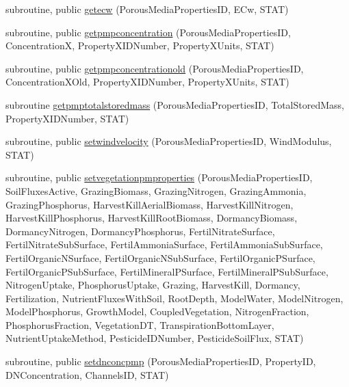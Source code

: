 \begin{DoxyCompactItemize}
subroutine, public \mbox{\hyperlink{namespacemoduleporousmediaproperties_a24f7231dc218de6931238c8726e07bf9}{getecw}} (Porous\+Media\+Properties\+ID, E\+Cw, S\+T\+AT)
\item 
subroutine, public \mbox{\hyperlink{namespacemoduleporousmediaproperties_a7f77a3cf092866b51da8931bff80a9e3}{getpmpconcentration}} (Porous\+Media\+Properties\+ID, ConcentrationX, Property\+X\+I\+D\+Number, Property\+X\+Units, S\+T\+AT)
\item 
subroutine, public \mbox{\hyperlink{namespacemoduleporousmediaproperties_aad77475234f116fbce60ab8837dfd9e9}{getpmpconcentrationold}} (Porous\+Media\+Properties\+ID, Concentration\+X\+Old, Property\+X\+I\+D\+Number, Property\+X\+Units, S\+T\+AT)
\item 
subroutine \mbox{\hyperlink{namespacemoduleporousmediaproperties_a2c248d4114a4213bca448f9d77478f28}{getpmptotalstoredmass}} (Porous\+Media\+Properties\+ID, Total\+Stored\+Mass, Property\+X\+I\+D\+Number, S\+T\+AT)
\item 
subroutine, public \mbox{\hyperlink{namespacemoduleporousmediaproperties_a3c0d671b8b697248b218443e59bb2cb8}{setwindvelocity}} (Porous\+Media\+Properties\+ID, Wind\+Modulus, S\+T\+AT)
\item 
subroutine, public \mbox{\hyperlink{namespacemoduleporousmediaproperties_aa2e7bcc28c7132e8ea2228f7f1e227d2}{setvegetationpmproperties}} (Porous\+Media\+Properties\+ID, Soil\+Fluxes\+Active, Grazing\+Biomass, Grazing\+Nitrogen, Grazing\+Ammonia, Grazing\+Phosphorus, Harvest\+Kill\+Aerial\+Biomass, Harvest\+Kill\+Nitrogen, Harvest\+Kill\+Phosphorus, Harvest\+Kill\+Root\+Biomass, Dormancy\+Biomass, Dormancy\+Nitrogen, Dormancy\+Phosphorus, Fertil\+Nitrate\+Surface, Fertil\+Nitrate\+Sub\+Surface, Fertil\+Ammonia\+Surface, Fertil\+Ammonia\+Sub\+Surface, Fertil\+Organic\+N\+Surface, Fertil\+Organic\+N\+Sub\+Surface, Fertil\+Organic\+P\+Surface, Fertil\+Organic\+P\+Sub\+Surface, Fertil\+Mineral\+P\+Surface, Fertil\+Mineral\+P\+Sub\+Surface, Nitrogen\+Uptake, Phosphorus\+Uptake, Grazing, Harvest\+Kill, Dormancy, Fertilization, Nutrient\+Fluxes\+With\+Soil, Root\+Depth, Model\+Water, Model\+Nitrogen, Model\+Phosphorus, Growth\+Model, Coupled\+Vegetation, Nitrogen\+Fraction, Phosphorus\+Fraction, Vegetation\+DT, Transpiration\+Bottom\+Layer, Nutrient\+Uptake\+Method, Pesticide\+I\+D\+Number, Pesticide\+Soil\+Flux, S\+T\+AT)
\item 
subroutine, public \mbox{\hyperlink{namespacemoduleporousmediaproperties_a06259226fc0457f3a2a483e2de48d783}{setdnconcpmp}} (Porous\+Media\+Properties\+ID, Property\+ID, D\+N\+Concentration, Channels\+ID, S\+T\+AT)

\end{DoxyCompactItemize}
